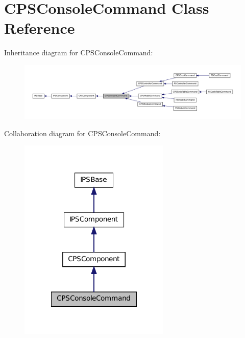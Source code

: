 \hypertarget{classCPSConsoleCommand}{
\section{CPSConsoleCommand Class Reference}
\label{classCPSConsoleCommand}
}


Inheritance diagram for CPSConsoleCommand:\nopagebreak
\begin{figure}[H]
\begin{center}
\leavevmode
\includegraphics[width=400pt]{classCPSConsoleCommand__inherit__graph}
\end{center}
\end{figure}


Collaboration diagram for CPSConsoleCommand:\nopagebreak
\begin{figure}[H]
\begin{center}
\leavevmode
\includegraphics[width=204pt]{classCPSConsoleCommand__coll__graph}
\end{center}
\end{figure}
